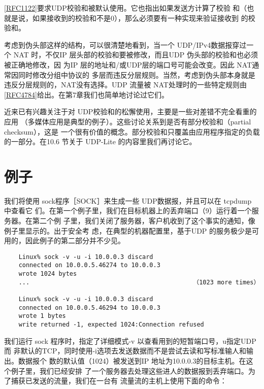 \begin{tcolorbox}
    \href{https://www.rfc-editor.org/rfc/rfc1122}{[RFC1122]}要求UDP校验和被默认使用。它也指出如果发送方计算了校验
    和（也就是说，如果接收到的校验和不是0），那么必须要有一种实现来验证接收到
    的校验和。
\end{tcolorbox}

考虑到伪头部这样的结构，可以很清楚地看到，当一个 UDP/IPv4数据报穿过一个 NAT
时，不仅IP 层头部的校验和要被修改，而且UDP 伪头部的校验和也必须被正确地修改，因
为IP 层的地址和/或UDP层的端口号可能会改变。因此 NAT通常因同时修改分组中协议的
多层而违反分层规则。当然，考虑到伪头部本身就是违反分层规则的，NAT没有选择。UDP
流量被 NAT处理时的一些特定规则由\href{https://www.rfc-editor.org/rfc/rfc4784}{[RFC4784]}给出。在第7章我们也简单地讨论过它们。

近来已有兴趣关注于对 UDP校验和的松懈使用，主要是一些对差错不完全看重的应用
（多媒体应用是典型的例子）。这些讨论关系到是否有部分校验和（partial checksum），这是
一个很有价值的概念。部分校验和只覆盖由应用程序指定的负载的一部分。在10.6 节关于
UDP-Lite 的内容里我们再讨论它。

\section{例子}
我们将使用 sock程序［SOCK］来生成一些 UDP数据报，并且可以在 tcpdump 中查看它
们。在第一个例子里，我们在目标机器上的丢弃端口（9）运行着一个服务器。在第二个例
子里，我们关闭了服务器，客户机收到了这个事实的通知，像例子里显示的。出于安全考
虑，在典型的机器配置里，基于UDP 的服务极少是可用的，因此例子的第二部分并不少见。

\begin{verbatim}
    Linux% sock -v -u -i 10.0.0.3 discard
    connected on 10.0.0.5.46274 to 10.0.0.3
    wrote 1024 bytes
    ...                                             （1023 more times）

    Linux% sock -v -u -i 10.0.0.3 discard
    connected on 10.0.0.5.46294 to 10.0.0.3
    wrote 1 bytes
    write returned -1, expected 1024:Connection refused
\end{verbatim}

我们运行 sock 程序时，指定了详细模式-v 以查看用到的短暂端口号，u指定UDP而
非默认的TCP，同时使用-i选项去发送数据而不是尝试去读和写标准输人和输出。数据报个
数的默认值（1024）被发送到IP 地址为10.0.0.3的目标主机。在这个例子里，我们已经安排
了一个服务器去处理这些进人的数据报到丢弃端口。为了捕获已发送的流量，我们在一台有
流量流的主机上使用下面的命令：


